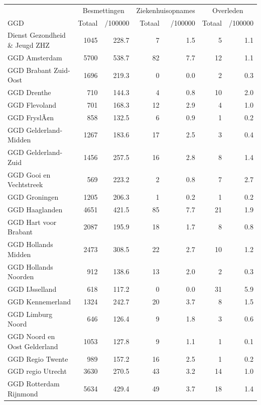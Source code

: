 \documentclass[
  english,
  man,floatsintext]{apa6}
\begin{document}
\begin{table}[H]
\centering\begingroup\fontsize{10}{12}\selectfont

\begin{threeparttable}
\begin{tabular}{lrrrrrr}
\toprule
\multicolumn{1}{c}{ } & \multicolumn{2}{c}{Besmettingen} & \multicolumn{2}{c}{Ziekenhuisopnames} & \multicolumn{2}{c}{Overleden} \\
\cmidrule(l{3pt}r{3pt}){2-3} \cmidrule(l{3pt}r{3pt}){4-5} \cmidrule(l{3pt}r{3pt}){6-7}
GGD & Totaal & /100000 & Totaal & /100000 & Totaal & /100000\\
\midrule
Dienst Gezondheid \& Jeugd ZHZ & 1045 & 228.7 & 7 & 1.5 & 5 & 1.1\\
GGD Amsterdam & 5700 & 538.7 & 82 & 7.7 & 12 & 1.1\\
GGD Brabant Zuid-Oost & 1696 & 219.3 & 0 & 0.0 & 2 & 0.3\\
GGD Drenthe & 710 & 144.3 & 4 & 0.8 & 10 & 2.0\\
GGD Flevoland & 701 & 168.3 & 12 & 2.9 & 4 & 1.0\\
GGD FryslÃ¢n & 858 & 132.5 & 6 & 0.9 & 1 & 0.2\\
GGD Gelderland-Midden & 1267 & 183.6 & 17 & 2.5 & 3 & 0.4\\
GGD Gelderland-Zuid & 1456 & 257.5 & 16 & 2.8 & 8 & 1.4\\
GGD Gooi en Vechtstreek & 569 & 223.2 & 2 & 0.8 & 7 & 2.7\\
GGD Groningen & 1205 & 206.3 & 1 & 0.2 & 1 & 0.2\\
GGD Haaglanden & 4651 & 421.5 & 85 & 7.7 & 21 & 1.9\\
GGD Hart voor Brabant & 2087 & 195.9 & 18 & 1.7 & 8 & 0.8\\
GGD Hollands Midden & 2473 & 308.5 & 22 & 2.7 & 10 & 1.2\\
GGD Hollands Noorden & 912 & 138.6 & 13 & 2.0 & 2 & 0.3\\
GGD IJsselland & 618 & 117.2 & 0 & 0.0 & 31 & 5.9\\
GGD Kennemerland & 1324 & 242.7 & 20 & 3.7 & 8 & 1.5\\
GGD Limburg Noord & 646 & 126.4 & 9 & 1.8 & 3 & 0.6\\
GGD Noord en Oost Gelderland & 1053 & 127.8 & 9 & 1.1 & 1 & 0.1\\
GGD Regio Twente & 989 & 157.2 & 16 & 2.5 & 1 & 0.2\\
GGD regio Utrecht & 3630 & 270.5 & 43 & 3.2 & 14 & 1.0\\
GGD Rotterdam Rijnmond & 5634 & 429.4 & 49 & 3.7 & 18 & 1.4\\

\end{tabular}
\end{threeparttable}
\end{table}
\end{document}
